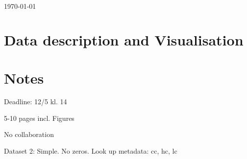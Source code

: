 \documentclass{article}
\begin{document}
\today
\tableofcontents


\section{Data description and Visualisation}\label{sec: Descript_visual} %






\newpage{}

\section{Notes}

Deadline: 12/5 kl. 14

5-10 pages incl. Figures

No collaboration


Dataset 2: Simple. No zeros. Look up metadata: cc, hc, lc \newline


%
%
%
%
%
\end{document}
